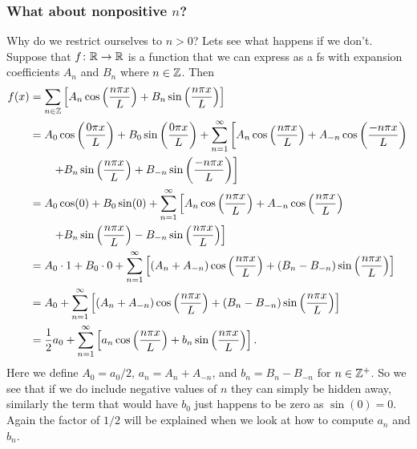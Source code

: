 \documentclass[a4paper]{article}
\begin{document}
    \subsubsection{What about nonpositive \texorpdfstring{\(n\)}{n}?}
    Why do we restrict ourselves to \(n > 0\)?
    Lets see what happens if we don't.
    Suppose that \(f\colon\mathbb{R}\to\mathbb{R}\) is a function that we can express as a \acrshort{fs} with expansion coefficients \(A_n\) and \(B_n\) where \(n\in\mathbb{Z}\).
    Then
    \begin{align*}
        f(x) &= \sum_{n\in\mathbb{Z}}\left[A_n\cos\left(\frac{n\pi x}{L}\right) + B_n\sin\left(\frac{n\pi x}{L}\right)\right]\\
        &= A_0\cos\left(\frac{0\pi x}{L}\right) + B_0\sin\left(\frac{0\pi x}{L}\right) + \sum_{n=1}^\infty\left[A_n\cos\left(\frac{n\pi x}{L}\right) + A_{-n}\cos\left(\frac{-n\pi x}L{}\right)\right.\\
        &\left.\qquad+ B_n\sin\left(\frac{n\pi x}{L}\right) + B_{-n}\sin\left(\frac{-n\pi x}{L}\right)\right]\\
        &= A_0\cos(0) + B_0\sin(0) + \sum_{n=1}^\infty\left[A_n\cos\left(\frac{n\pi x}{L}\right) + A_{-n}\cos\left(\frac{n\pi x}L{}\right)\right.\\
        &\left.\qquad+ B_n\sin\left(\frac{n\pi x}{L}\right) - B_{-n}\sin\left(\frac{n\pi x}{L}\right)\right]\\
        &= A_0\cdot 1 + B_0\cdot 0 + \sum_{n=1}^\infty\left[(A_n + A_{-n})\cos\left(\frac{n\pi x}{L}\right) + (B_n - B_{-n})\sin\left(\frac{n\pi x}{L} \right)\right]\\
        &= A_0 + \sum_{n=1}^\infty\left[(A_n + A_{-n})\cos\left(\frac{n\pi x}{L}\right) + (B_n - B_{-n})\sin\left(\frac{n\pi x}{L}\right)\right]\\
        &= \frac{1}{2}a_0 + \sum_{n=1}^\infty\left[a_n\cos\left(\frac{n\pi x}{L}\right) + b_n\sin\left(\frac{n\pi x}{L}\right)\right].
    \end{align*}
    Here we define \(A_0 = a_0/2\), \(a_n = A_n + A_{-n}\), and \(b_n = B_n - B_{-n}\) for \(n\in\mathbb{Z}^+\).
    So we see that if we do include negative values of \(n\) they can simply be hidden away, similarly the term that would have \(b_0\) just happens to be zero as \(\sin(0) = 0\).
    Again the factor of \(1/2\) will be explained when we look at how to compute \(a_n\) and \(b_n\).
    
\end{document}
